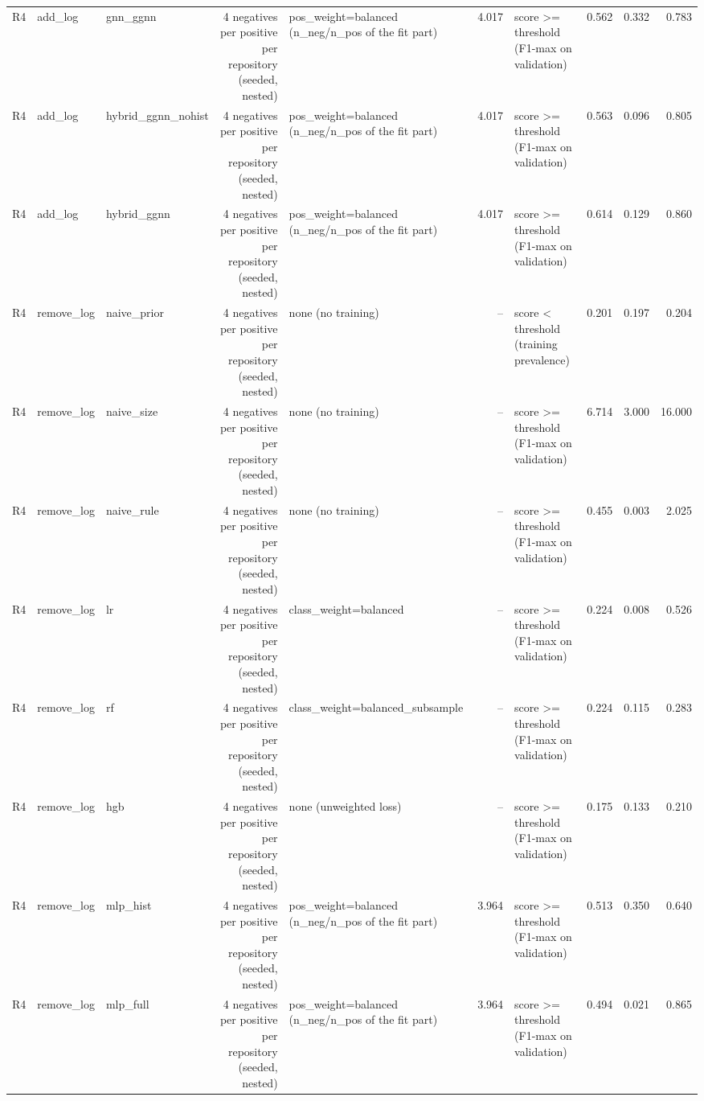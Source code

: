 \begin{table}[htbp]
{\begin{tabular}{lllrlrlrrr}
R4 & add\_log & gnn\_ggnn & 4 negatives per positive per repository (seeded, nested) & pos\_weight=balanced (n\_neg/n\_pos of the fit part) & 4.017 & score >= threshold (F1-max on validation) & 0.562 & 0.332 & 0.783 \\
R4 & add\_log & hybrid\_ggnn\_nohist & 4 negatives per positive per repository (seeded, nested) & pos\_weight=balanced (n\_neg/n\_pos of the fit part) & 4.017 & score >= threshold (F1-max on validation) & 0.563 & 0.096 & 0.805 \\
R4 & add\_log & hybrid\_ggnn & 4 negatives per positive per repository (seeded, nested) & pos\_weight=balanced (n\_neg/n\_pos of the fit part) & 4.017 & score >= threshold (F1-max on validation) & 0.614 & 0.129 & 0.860 \\
R4 & remove\_log & naive\_prior & 4 negatives per positive per repository (seeded, nested) & none (no training) & -- & score < threshold (training prevalence) & 0.201 & 0.197 & 0.204 \\
R4 & remove\_log & naive\_size & 4 negatives per positive per repository (seeded, nested) & none (no training) & -- & score >= threshold (F1-max on validation) & 6.714 & 3.000 & 16.000 \\
R4 & remove\_log & naive\_rule & 4 negatives per positive per repository (seeded, nested) & none (no training) & -- & score >= threshold (F1-max on validation) & 0.455 & 0.003 & 2.025 \\
R4 & remove\_log & lr & 4 negatives per positive per repository (seeded, nested) & class\_weight=balanced & -- & score >= threshold (F1-max on validation) & 0.224 & 0.008 & 0.526 \\
R4 & remove\_log & rf & 4 negatives per positive per repository (seeded, nested) & class\_weight=balanced\_subsample & -- & score >= threshold (F1-max on validation) & 0.224 & 0.115 & 0.283 \\
R4 & remove\_log & hgb & 4 negatives per positive per repository (seeded, nested) & none (unweighted loss) & -- & score >= threshold (F1-max on validation) & 0.175 & 0.133 & 0.210 \\
R4 & remove\_log & mlp\_hist & 4 negatives per positive per repository (seeded, nested) & pos\_weight=balanced (n\_neg/n\_pos of the fit part) & 3.964 & score >= threshold (F1-max on validation) & 0.513 & 0.350 & 0.640 \\
R4 & remove\_log & mlp\_full & 4 negatives per positive per repository (seeded, nested) & pos\_weight=balanced (n\_neg/n\_pos of the fit part) & 3.964 & score >= threshold (F1-max on validation) & 0.494 & 0.021 & 0.865 \\

\end{tabular}}
\end{table}
